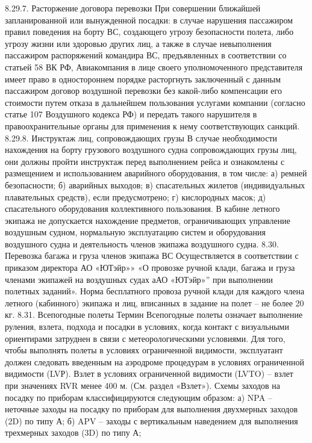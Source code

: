 8.29.7.	Расторжение договора перевозки
При совершении ближайшей запланированной или вынужденной посадки: в случае нарушения пассажиром правил поведения на борту ВС, создающего угрозу безопасности полета, либо угрозу жизни или здоровью других лиц, а также в случае невыполнения пассажиром распоряжений командира ВС, предъявленных в соответствии со статьей 58 ВК РФ, Авиакомпания в лице своего уполномоченного представителя имеет право в одностороннем порядке расторгнуть заключенный с данным пассажиром договор воздушной перевозки без какой-либо компенсации его стоимости путем отказа в дальнейшем пользования услугами компании (согласно статье 107 Воздушного кодекса РФ) и передать такого нарушителя в правоохранительные органы для применения к нему соответствующих санкций.
8.29.8.	Инструктаж лиц, сопровождающих грузы 
В случае необходимости нахождения на борту грузового воздушного судна сопровождающих грузы лиц, они должны пройти инструктаж перед выполнением рейса и ознакомлены с размещением и использованием аварийного оборудования, в том числе:
а)	ремней безопасности;
б)	аварийных выходов;
в)	спасательных жилетов (индивидуальных плавательных средств), если предусмотрено;
г)	кислородных масок;
д)	спасательного оборудования коллективного пользования.
В кабине летного экипажа не допускается нахождение предметов, ограничивающих управление воздушным судном, нормальную эксплуатацию систем и оборудования воздушного судна и деятельность членов экипажа воздушного судна. 
8.30.	Перевозка багажа и груза членов экипажа ВС
Осуществляется в соответствии с приказом директора АО «ЮТэйр»» «О провозке ручной клади, багажа и груза членами экипажей на воздушных судах аАО «ЮТэйр»” при выполнении полетных заданий». Норма бесплатного провоза ручной клади для каждого члена летного (кабинного) экипажа и лиц, вписанных в задание на полет – не более 20 кг.
8.31.	Всепогодные полеты
Термин Всепогодные полеты означает выполнение руления, взлета, подхода и посадки в условиях, когда контакт с визуальными ориентирами затруднен в связи с метеорологическими условиями.
Для того, чтобы выполнять полеты в условиях ограниченной видимости, эксплуатант должен следовать введенным на аэродроме процедурам в условиях ограниченной видимости (LVР).
Взлет в условиях ограниченной видимости (LVTO) – взлет при значениях RVR менее 400 м. (См. раздел «Взлет»).
Схемы заходов на посадку по приборам классифицируются следующим образом:
а)	NPA – неточные заходы на посадку по приборам для выполнения двухмерных заходов (2D) по типу А;
б)	APV – заходы с вертикальным наведением для выполнения трехмерных заходов (3D) по типу А;
